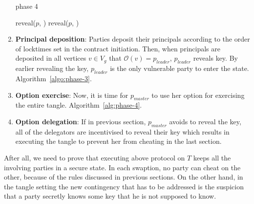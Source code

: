 \begin{enumerate}
\begin{algorithm}[H]
\begin{algorithmic}
    \end{algorithmic}
    \end{algorithm}

    \begin{algorithm} [H]
    \centering
    \caption{phase 4}
    \label{alg:phase-4}
    \begin{algorithmic}
    \State reveal($p$, \Atwo)
    \Else
    \EndWhile
    \State reveal($p$, \Atwo)
    \EndIf

        
    \end{algorithmic}
    \end{algorithm}
    
      \item \textbf{Principal deposition}: Parties deposit their principals according to the order of locktimes set in the contract initiation. Then, when principals are deposited in all vertices $v \in V_g$ that $\mathcal{O}(v) = p_{leader}$, $p_{leader}$ reveals \keyone key. By earlier revealing the key, $p_{leader}$ is the only vulnerable party to enter the \underwater state. Algorithm~\ref{algo:phase-3}.
      
        \item \textbf{Option exercise}: Now, it is time for $p_{master}$ to use her option for exercising the entire tangle. Algorithm~\ref{alg:phase-4}.
   
    \item \textbf{Option delegation}: If in previous section, $p_{master}$ avoids to reveal the \Atwo key, all of the delegators are incentivised to reveal their key which results in executing the tangle to prevent her from cheating in the last section.
    
    
\end{enumerate}

After all, we need to prove that executing above protocol on $T$ keeps all the involving parties in a secure state. In each swaption, no party can cheat on the other, because of the rules discussed in previous sections. On the other hand, in the tangle setting the new contingency that has to be addressed is the suspicion that a party secretly knows some key that he is not supposed to know.

